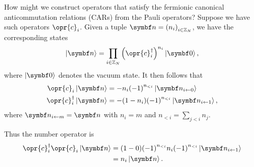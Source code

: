 \documentclass[../thesis.tex]{subfiles}
\begin{document}
How might we construct operators that satisfy the fermionic canonical
anticommutation relations (CARs) from the Pauli operators? Suppose we have such
operators $\opr{c}_i$. Given a tuple $\tq{n} = {\qty(n_i)}_{i\in\ZZ_N}$, we have the
corresponding states
\begin{equation}
  \ket{\tq{n}}
  = \prod_{i\in\ZZ_N} {\qty(\opr{c}_i^\dag)}^{n_i} \ket{\tq{0}},
\end{equation}
where $\ket{\tq{0}}$ denotes the vacuum state. It then follows that
\begin{align}
  \opr{c}_i\ket{\tq{n}}
  &= -n_i {(-1)}^{n_{<i}}\ket{\tq{n}_{i \leftarrow 0}}
  \label{eq:car-action} \\
  \opr{c}_i^\dag\ket{\tq{n}}
  &= -(1 - n_i){(-1)}^{n_{<i}}\ket{\tq{n}_{i \leftarrow 1}},
\end{align}
where $\tq{n}_{i \leftarrow m} = \tq{n}$ with $n_i = m$ and $n_{<i} = \sum_{j <
i} n_j$.

Thus the number operator is
\begin{align}
  \opr{c}_i^\dag \opr{c}_i \ket{\tq{n}}
  &= (1-0){(-1)}^{n_{<i}} n_i{(-1)}^{n_{<i}} \ket{\tq{n}_{i \leftarrow 1}} \\
  &= n_i\ket{\tq{n}}.
\end{align}
\end{document}

